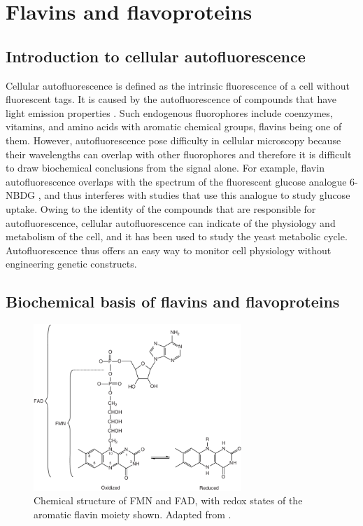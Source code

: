 \section{Flavins and flavoproteins}
\label{sec:intro-flavin}

\subsection{Introduction to cellular autofluorescence}
\label{subsec:intro-flavin-autofluo}

Cellular autofluorescence is defined as the intrinsic fluorescence of a cell without fluorescent tags.
It is caused by the autofluorescence of compounds that have light emission properties \parencite{maslankaAutofluorescenceYeastSaccharomyces2018}.
Such endogenous fluorophores include coenzymes, vitamins, and amino acids with aromatic chemical groups, flavins being one of them.
However, autofluorescence pose difficulty in cellular microscopy because their wavelengths can overlap with other fluorophores and therefore it is difficult to draw biochemical conclusions from the signal alone.
For example, flavin autofluorescence overlaps with the spectrum of the fluorescent glucose analogue 6-NBDG \parencite{maslankaAutofluorescenceYeastSaccharomyces2018}, and thus interferes with studies that use this analogue to study glucose uptake.
Owing to the identity of the compounds that are responsible for autofluorescence, cellular autofluorescence can indicate of the physiology and metabolism of the cell, and it has been used to study the yeast metabolic cycle.
Autofluorescence thus offers an easy way to monitor cell physiology without engineering genetic constructs.

\subsection{Biochemical basis of flavins and flavoproteins}
\label{subsec:intro-flavin-biochem}

\begin{figure}
  \centering
  \includegraphics[width=0.7\textwidth]{patelFlavinContainingOxidativeBiocatalysts2006_1}
  \caption{
    Chemical structure of FMN and FAD, with redox states of the aromatic flavin moiety shown.
    Adapted from \textcite{patelFlavinContainingOxidativeBiocatalysts2006}.}
  \label{fig:intro-flavin-structure}
\end{figure}

